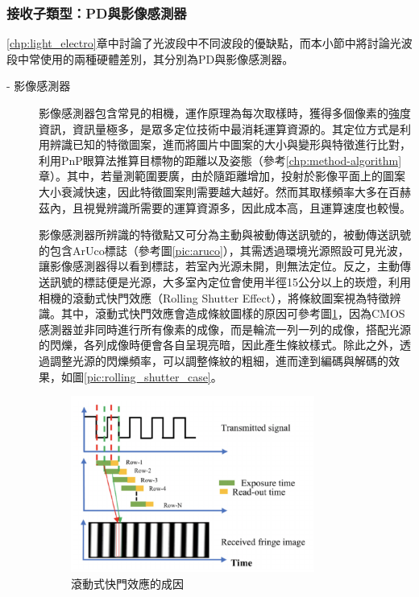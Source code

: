             \subsubsection{接收子類型：PD與影像感測器}
            \label{chp:light_receiver}

                

                \ref{chp:light_electro}章中討論了光波段中不同波段的優缺點，而本小節中將討論光波段中常使用的兩種硬體差別，其分別為PD與影像感測器。

                \begin{description}

                    \item[- 影像感測器]\hfill 
                    
                    \qquad
                    影像感測器包含常見的相機，運作原理為每次取樣時，獲得多個像素的強度資訊，資訊量極多，是眾多定位技術中最消耗運算資源的。其定位方式是利用辨識已知的特徵圖案，進而將圖片中圖案的大小與變形與特徵進行比對，利用PnP眼算法推算目標物的距離以及姿態（參考\ref{chp:method-algorithm}章）。其中，若量測範圍要廣，由於隨距離增加，投射於影像平面上的圖案大小衰減快速，因此特徵圖案則需要越大越好。然而其取樣頻率大多在百赫茲內，且視覺辨識所需要的運算資源多，因此成本高，且運算速度也較慢。

                    \qquad
                    影像感測器所辨識的特徵點又可分為主動與被動傳送訊號的，被動傳送訊號的包含ArUco標誌（參考圖\ref{pic:aruco}），其需透過環境光源照設可見光波，讓影像感測器得以看到標誌，若室內光源未開，則無法定位。反之，主動傳送訊號的標誌便是光源，大多室內定位會使用半徑15公分以上的崁燈，利用相機的滾動式快門效應（Rolling Shutter Effect），將條紋圖案視為特徵辨識。其中，滾動式快門效應會造成條紋圖樣的原因可參考圖\ref{pic:rolling_shutter}，因為CMOS感測器並非同時進行所有像素的成像，而是輪流一列一列的成像，搭配光源的閃爍，各列成像時便會各自呈現亮暗，因此產生條紋樣式。除此之外，透過調整光源的閃爍頻率，可以調整條紋的粗細，進而達到編碼與解碼的效果，如圖\ref{pic:rolling_shutter_case}。

                    \begin{figure}[h]
                        \centering
                        \includegraphics[width=8cm]{ch2pic/rolling_shutter.png}
                        \caption{滾動式快門效應的成因\cite{pic:rolling_shutter}}
                        \label{pic:rolling_shutter}
                    \end{figure}


\end{description}
